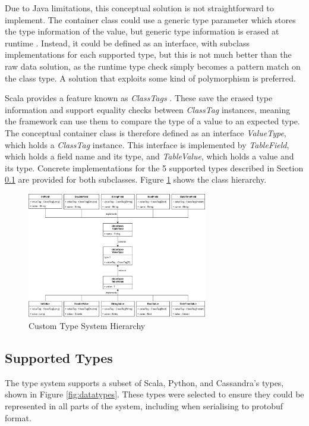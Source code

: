 Due to Java limitations, this conceptual solution is not straightforward to implement. The container class could use a generic type parameter which stores the type information of the value, but generic type information is erased at runtime \cite{ghosh2004generics}. Instead, it could be defined as an interface, with subclass implementations for each supported type, but this is not much better than the raw data solution, as the runtime type check simply becomes a pattern match on the class type. A solution that exploits some kind of polymorphism is preferred. 

Scala provides a feature known as \textit{ClassTags} \cite{scalaclasstags}. These save the erased type information and support equality checks between \textit{ClassTag} instances, meaning the framework can use them to compare the type of a value to an expected type. The conceptual container class is therefore defined as an interface \textit{ValueType}, which holds a \textit{ClassTag} instance. This interface is implemented by \textit{TableField}, which holds a field name and its type, and \textit{TableValue}, which holds a value and its type. Concrete implementations for the 5 supported types described in Section \ref{subsec:supported-types} are provided for both subclasses. Figure \ref{fig:type-system-hierarchy} shows the class hierarchy.

\begin{figure}[htp]
	\centering
	\includegraphics[width=0.7\textwidth]{chapters/diagrams/implementation/type-system-hierarchy}
	\caption{Custom Type System Hierarchy}
	\label{fig:type-system-hierarchy}
\end{figure}

\pagebreak
\subsection{Supported Types}\label{subsec:supported-types}
The type system supports a subset of Scala, Python, and Cassandra's types, shown in Figure \ref{fig:datatypes}. These types were selected to ensure they could be represented in all parts of the system, including when serialising to protobuf format.

